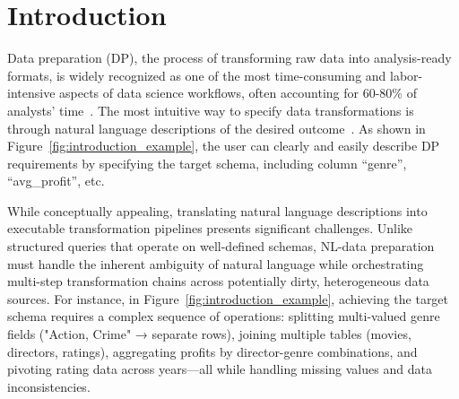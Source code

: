 \section{Introduction}
\label{sec:intro}






Data preparation (DP), the process of transforming raw data into analysis-ready formats, is widely recognized as one of the most time-consuming and labor-intensive aspects of data science workflows, often accounting for 60-80\% of analysts' time~\cite{dasu2003exploratory, deng2017data}. 
The most intuitive way to specify data transformations is through natural language descriptions of the desired outcome~\cite{jin2025elt}. As shown in Figure~\ref{fig:introduction_example}, the user can clearly and easily describe DP requirements by specifying the target schema, including column ``genre'', ``avg\_profit'', etc.

 While conceptually appealing, translating natural language descriptions into executable transformation pipelines presents significant challenges. Unlike structured queries that operate on well-defined schemas, NL-\nlwhat data preparation must handle the inherent ambiguity of natural language while orchestrating multi-step transformation chains across potentially dirty, heterogeneous data sources. For instance, in Figure~\ref{fig:introduction_example}, achieving the target schema requires a complex sequence of operations: splitting multi-valued genre fields (\eg "Action, Crime" → separate rows), joining multiple tables (movies, directors, ratings), aggregating profits by director-genre combinations, and pivoting rating data across years—all while handling missing values and data inconsistencies.

